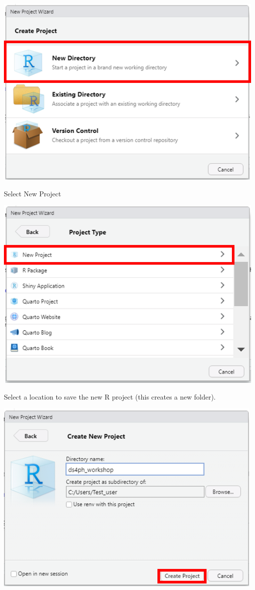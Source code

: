 \documentclass[
  letterpaper,
  DIV=11,
  numbers=noendperiod,
  oneside]{scrreprt}
\begin{document}
\includegraphics{./images/paste-DCC39BB5.png}

Select New Project

\includegraphics{./images/paste-30A4402B.png}

Select a location to save the new R project (this creates a new folder).

\includegraphics[width=5.20833in,height=\textheight]{./images/paste-C05F97BD.png}
\end{document}
